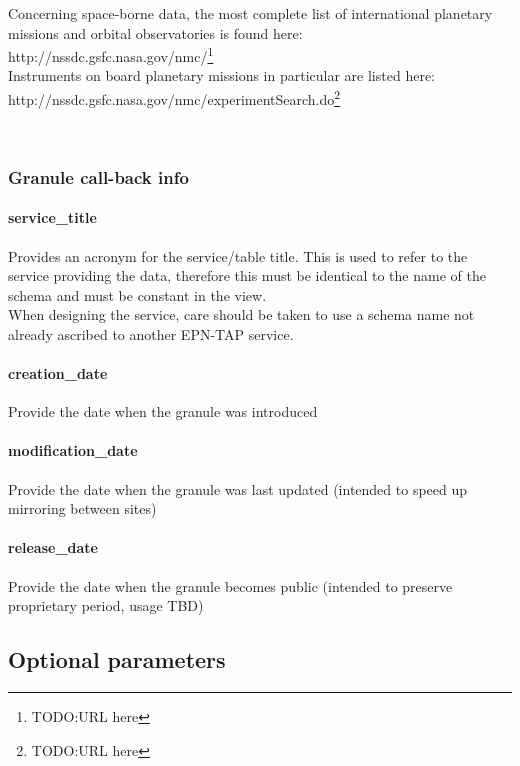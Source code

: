 \documentclass[11pt,a4paper]{ivoa}
\begin{document}
Concerning space-borne data, the most complete list of international planetary missions and orbital observatories is found here:\\ http://nssdc.gsfc.nasa.gov/nmc/\footnote{TODO:URL here}\\ Instruments on board planetary missions in particular are listed here:\\ http://nssdc.gsfc.nasa.gov/nmc/experimentSearch.do\footnote{TODO:URL here}

 

\subsubsection{Granule call-back info}

\paragraph{service\_title}

Provides an acronym for the service/table title. This is used to refer to the service providing the data, therefore this must be identical to the name of the schema and must be constant in the view.\\When designing the service, care should be taken to use a schema name not already ascribed to another EPN-TAP service.

\paragraph{creation\_date}

Provide the date when the granule was introduced

\paragraph{modification\_date}

Provide the date when the granule was last updated (intended to speed up mirroring between sites)

\paragraph{release\_date}

Provide the date when the granule becomes public (intended to preserve proprietary period, usage TBD)

\subsection{Optional parameters}
\end{document}
